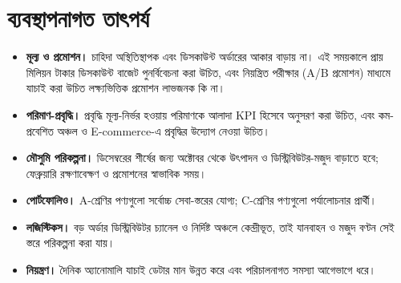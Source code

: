 \section{ব্যবস্থাপনাগত তাৎপর্য}
\begin{itemize}
  \item \textbf{মূল্য ও প্রমোশন।} চাহিদা অস্থিতিস্থাপক এবং ডিসকাউন্ট অর্ডারের আকার বাড়ায় না। এই সময়কালে প্রায় \DiscountCost মিলিয়ন টাকার
        ডিসকাউন্ট বাজেট পুনর্বিবেচনা করা উচিত, এবং নিয়ন্ত্রিত পরীক্ষার (A/B প্রমোশন) মাধ্যমে যাচাই করা উচিত লক্ষ্যভিত্তিক প্রমোশন লাভজনক কি না।
  \item \textbf{পরিমাণ-প্রবৃদ্ধি।} প্রবৃদ্ধি মূল্য-নির্ভর হওয়ায় পরিমাণকে আলাদা KPI হিসেবে অনুসরণ করা উচিত, এবং কম-প্রবেশিত অঞ্চল ও
        E-commerce-এ প্রবৃদ্ধির উদ্যোগ নেওয়া উচিত।
  \item \textbf{মৌসুমি পরিকল্পনা।} ডিসেম্বরের শীর্ষের জন্য অক্টোবর থেকে উৎপাদন ও ডিস্ট্রিবিউটর-মজুদ বাড়াতে হবে; ফেব্রুয়ারি রক্ষণাবেক্ষণ ও
        প্রমোশনের স্বাভাবিক সময়।
  \item \textbf{পোর্টফোলিও।} A-শ্রেণির পণ্যগুলো সর্বোচ্চ সেবা-স্তরের যোগ্য; C-শ্রেণির পণ্যগুলো পর্যালোচনার প্রার্থী।
  \item \textbf{লজিস্টিকস।} বড় অর্ডার ডিস্ট্রিবিউটর চ্যানেল ও নির্দিষ্ট অঞ্চলে কেন্দ্রীভূত, তাই যানবাহন ও মজুদ বণ্টন সেই স্তরে পরিকল্পনা করা যায়।
  \item \textbf{নিয়ন্ত্রণ।} দৈনিক অ্যানোমালি যাচাই ডেটার মান উন্নত করে এবং পরিচালনাগত সমস্যা আগেভাগে ধরে।
\end{itemize}


